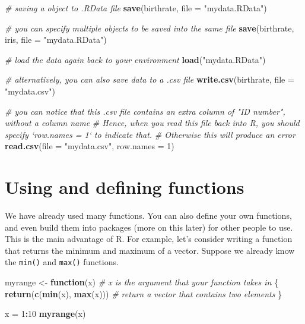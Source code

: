 \documentclass[
]{book}
\newenvironment{Shaded}{\begin{snugshade}}{\end{snugshade}}
\newcommand{\CommentTok}[1]{\textcolor[rgb]{0.56,0.35,0.01}{\textit{#1}}}
\newcommand{\ControlFlowTok}[1]{\textcolor[rgb]{0.13,0.29,0.53}{\textbf{#1}}}
\newcommand{\DataTypeTok}[1]{\textcolor[rgb]{0.13,0.29,0.53}{#1}}
\newcommand{\DecValTok}[1]{\textcolor[rgb]{0.00,0.00,0.81}{#1}}
\newcommand{\KeywordTok}[1]{\textcolor[rgb]{0.13,0.29,0.53}{\textbf{#1}}}
\newcommand{\NormalTok}[1]{#1}
\newcommand{\OperatorTok}[1]{\textcolor[rgb]{0.81,0.36,0.00}{\textbf{#1}}}
\newcommand{\StringTok}[1]{\textcolor[rgb]{0.31,0.60,0.02}{#1}}
\begin{document}
\begin{Shaded}
\begin{Highlighting}[]
  \CommentTok{# saving a object to .RData file}
  \KeywordTok{save}\NormalTok{(birthrate, }\DataTypeTok{file =} \StringTok{"mydata.RData"}\NormalTok{)}

  \CommentTok{# you can specify multiple objects to be saved into the same file}
  \KeywordTok{save}\NormalTok{(birthrate, iris, }\DataTypeTok{file =} \StringTok{"mydata.RData"}\NormalTok{)}
  
  \CommentTok{# load the data again back to your environment}
  \KeywordTok{load}\NormalTok{(}\StringTok{"mydata.RData"}\NormalTok{)}
  
  \CommentTok{# alternatively, you can also save data to a .csv file}
  \KeywordTok{write.csv}\NormalTok{(birthrate, }\DataTypeTok{file =} \StringTok{"mydata.csv"}\NormalTok{)}
  
  \CommentTok{# you can notice that this .csv file contains an extra column of "ID number", without a column name}
  \CommentTok{# Hence, when you read this file back into R, you should specify `row.names = 1` to indicate that.}
  \CommentTok{# Otherwise this will produce an error}
  \KeywordTok{read.csv}\NormalTok{(}\DataTypeTok{file =} \StringTok{"mydata.csv"}\NormalTok{, }\DataTypeTok{row.names =} \DecValTok{1}\NormalTok{)}
\end{Highlighting}
\end{Shaded}

\hypertarget{using-and-defining-functions}{%
\section{Using and defining functions}\label{using-and-defining-functions}}

We have already used many functions. You can also define your own functions, and even build them into packages (more on this later) for other people to use. This is the main advantage of R. For example, let's consider writing a function that returns the minimum and maximum of a vector. Suppose we already know the \texttt{min()} and \texttt{max()} functions.

\begin{Shaded}
\begin{Highlighting}[]
\NormalTok{  myrange <-}\StringTok{ }\ControlFlowTok{function}\NormalTok{(x) }\CommentTok{# x is the argument that your function takes in}
\NormalTok{  \{}
    \KeywordTok{return}\NormalTok{(}\KeywordTok{c}\NormalTok{(}\KeywordTok{min}\NormalTok{(x), }\KeywordTok{max}\NormalTok{(x))) }\CommentTok{# return a vector that contains two elements}
\NormalTok{  \}}

\NormalTok{  x =}\StringTok{ }\DecValTok{1}\OperatorTok{:}\DecValTok{10}
  \KeywordTok{myrange}\NormalTok{(x)}
\end{Highlighting}
\end{Shaded}
\end{document}
